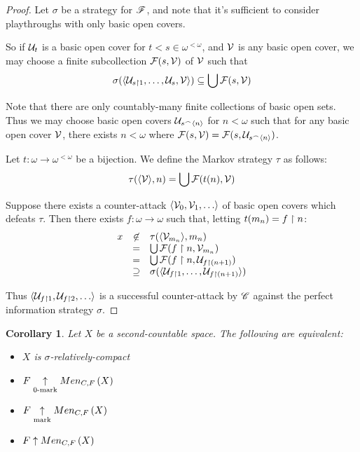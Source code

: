 \documentclass{amsart}
\newtheorem{corollary}[theorem]{Corollary}
\theoremstyle{definition}
\begin{document}
\begin{proof}
  Let \(\sigma\) be a strategy for \(\mathscr{F}\), and note that
  it's sufficient to consider playthroughs with only basic open covers.

  So if \(\mathcal{U}_t\) is a basic open cover for \(t<s\in\omega^{<\omega}\), and
  \(\mathcal{V}\) is any basic open cover, we may choose a finite subcollection
  \(\mathcal{F}(s,\mathcal{V})\) of \(\mathcal{V}\) such that
  \[
    \sigma(\langle\mathcal{U}_{s\restriction 1},\dots,\mathcal{U}_{s},\mathcal{V}\rangle)
      \subseteq
    \bigcup \mathcal{F}(s,\mathcal{V})
  \]

  Note that there are only countably-many finite collections of basic open sets.
  Thus we may choose basic open covers \(\mathcal{U}_{s{^\frown}\langle n\rangle}\) for \(n<\omega\)
  such that for any basic open cover \(\mathcal{V}\), there exists \(n<\omega\) where
  \(\mathcal{F}(s,\mathcal{V})=\mathcal{F}(s,\mathcal{U}_{s{^\frown}\langle n\rangle})\).

  Let \(t:\omega\to\omega^{<\omega}\) be a bijection. We define the Markov
  strategy \(\tau\) as follows:
  \[
    \tau(\langle\mathcal{V}\rangle, n)
      =
    \bigcup \mathcal{F}(t(n),\mathcal{V})
  \]

  Suppose there exists a counter-attack \(\<\mc V_0,\mc V_1,\dots\>\) of
  basic open covers which defeats \(\tau\). Then there exists
  \(f:\omega\to\omega\) such that, letting \(t(m_n)=f\restriction n\):
  \[
    \begin{array}{rcl}
    x & \not\in & \tau(\langle\mathcal{V}_{m_n}\rangle,m_n) \\
    & = & \bigcup\mathcal{F}(f\restriction n,\mathcal{V}_{m_n}) \\
    & = & \bigcup\mathcal{F}(f\restriction n,\mathcal{U}_{f\restriction (n+1)}) \\
    & \supseteq & \sigma(\langle\mathcal{U}_{f\restriction 1},\dots,\mathcal{U}_{f\restriction(n+1)}\rangle)
    \end{array}
  \]

  Thus \(\<\mc U_{f\rest 1}, \mc U_{f\rest 2},\dots\>\) is a successful
  counter-attack by \(\mathscr{C}\) against the perfect information strategy \(\sigma\).
\end{proof}

\begin{corollary}
  Let \(X\) be a second-countable space. The following are equivalent:
  \begin{itemize}
    \item \(X\) is \(\sigma\)-relatively-compact
    \item \(F \underset{0\text{-mark}}{\uparrow} Men_{C,F}\left({X}\right)\)
    \item \(F \underset{\text{mark}}{\uparrow} Men_{C,F}\left({X}\right)\)
    \item \(F \uparrow Men_{C,F}\left({X}\right)\)
  \end{itemize}
\end{corollary}
\end{document}
